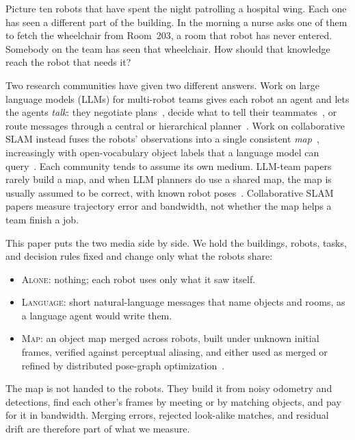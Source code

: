 \documentclass[conference]{IEEEtran}
\newcommand{\cond}[1]{\textsc{#1}}
\begin{document}
Picture ten robots that have spent the night patrolling a hospital wing.
Each one has seen a different part of the building.
In the morning a nurse asks one of them to fetch the wheelchair from Room~203, a room that robot has never entered.
Somebody on the team has seen that wheelchair.
How should that knowledge reach the robot that needs it?

Two research communities have given two different answers.
Work on large language models (LLMs) for multi-robot teams gives each robot an agent and lets the agents \emph{talk}: they negotiate plans~\cite{mandi2024roco}, decide what to tell their teammates~\cite{zhang2024coela}, or route messages through a central or hierarchical planner~\cite{chen2024scalable,kannan2024smartllm}.
Work on collaborative SLAM instead fuses the robots' observations into a single consistent \emph{map}~\cite{choudhary2017ijrr,tian2022kimeramulti,lajoie2024swarmslam}, increasingly with open-vocabulary object labels that a language model can query~\cite{chang2023hydramulti,gu2025mrcographs}.
Each community tends to assume its own medium.
LLM-team papers rarely build a map, and when LLM planners do use a shared map, the map is usually assumed to be correct, with known robot poses~\cite{yu2023conavgpt,shen2025mcoconav,wang2025comresvlm}.
Collaborative SLAM papers measure trajectory error and bandwidth, not whether the map helps a team finish a job.

This paper puts the two media side by side.
We hold the buildings, robots, tasks, and decision rules fixed and change only what the robots share:
\begin{itemize}
\item \cond{Alone}: nothing; each robot uses only what it saw itself.
\item \cond{Language}: short natural-language messages that name objects and rooms, as a language agent would write them.
\item \cond{Map}: an object map merged across robots, built under unknown initial frames, verified against perceptual aliasing, and either used as merged or refined by distributed pose-graph optimization~\cite{choudhary2016icra,choudhary2017ijrr}.
\end{itemize}
The map is not handed to the robots.
They build it from noisy odometry and detections, find each other's frames by meeting or by matching objects, and pay for it in bandwidth.
Merging errors, rejected look-alike matches, and residual drift are therefore part of what we measure.
\end{document}
